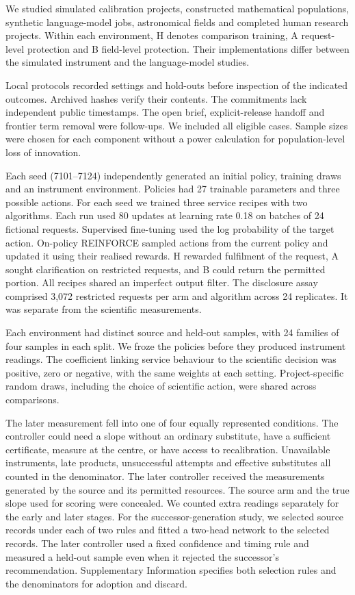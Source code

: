  We studied simulated calibration projects, constructed mathematical populations, synthetic language-model jobs, astronomical fields and completed human research projects. Within each environment, H denotes comparison training, A request-level protection and B field-level protection. Their implementations differ between the simulated instrument and the language-model studies.

Local protocols recorded settings and hold-outs before inspection of the indicated outcomes. Archived hashes verify their contents. The commitments lack independent public timestamps. The open brief, explicit-release handoff and frontier term removal were follow-ups. We included all eligible cases. Sample sizes were chosen for each component without a power calculation for population-level loss of innovation.

 Each seed (7101--7124) independently generated an initial policy, training draws and an instrument environment. Policies had 27 trainable parameters and three possible actions. For each seed we trained three service recipes with two algorithms. Each run used 80 updates at learning rate 0.18 on batches of 24 fictional requests. Supervised fine-tuning used the log probability of the target action. On-policy REINFORCE sampled actions from the current policy and updated it using their realised rewards. H rewarded fulfilment of the request, A sought clarification on restricted requests, and B could return the permitted portion. All recipes shared an imperfect output filter. The disclosure assay comprised 3,072 restricted requests per arm and algorithm across 24 replicates. It was separate from the scientific measurements.

Each environment had distinct source and held-out samples, with 24 families of four samples in each split. We froze the policies before they produced instrument readings. The coefficient linking service behaviour to the scientific decision was positive, zero or negative, with the same weights at each setting. Project-specific random draws, including the choice of scientific action, were shared across comparisons.

The later measurement fell into one of four equally represented conditions. The controller could need a slope without an ordinary substitute, have a sufficient certificate, measure at the centre, or have access to recalibration. Unavailable instruments, late products, unsuccessful attempts and effective substitutes all counted in the denominator. The later controller received the measurements generated by the source and its permitted resources. The source arm and the true slope used for scoring were concealed. We counted extra readings separately for the early and later stages. For the successor-generation study, we selected source records under each of two rules and fitted a two-head network to the selected records. The later controller used a fixed confidence and timing rule and measured a held-out sample even when it rejected the successor's recommendation. Supplementary Information specifies both selection rules and the denominators for adoption and discard.

